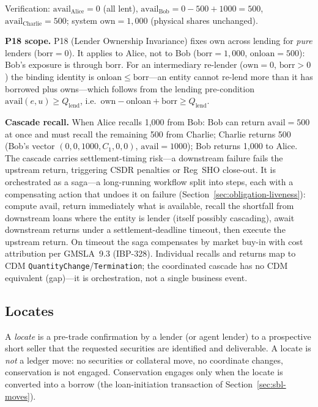 \documentclass[11pt,a4paper]{article}
\begin{document}
Verification: $\mathrm{avail}_{\text{Alice}} = 0$ (all lent), $\mathrm{avail}_{\text{Bob}} = 0-500+1000 = 500$, $\mathrm{avail}_{\text{Charlie}} = 500$; system $\mathrm{own} = 1{,}000$ (physical shares unchanged).

\noindent\textbf{P18 scope.} P18 (Lender Ownership Invariance) fixes $\mathrm{own}$ across lending for \emph{pure} lenders ($\mathrm{borr}=0$). It applies to Alice, not to Bob ($\mathrm{borr}=1{,}000$, $\mathrm{onloan}=500$): Bob's exposure is through $\mathrm{borr}$. For an intermediary re-lender ($\mathrm{own}=0$, $\mathrm{borr}>0$) the binding identity is $\mathrm{onloan}\leq\mathrm{borr}$---an entity cannot re-lend more than it has borrowed plus owns---which follows from the lending pre-condition $\mathrm{avail}(e,u)\geq Q_{\mathrm{lend}}$, i.e.\ $\mathrm{own}-\mathrm{onloan}+\mathrm{borr}\geq Q_{\mathrm{lend}}$.

\noindent\textbf{Cascade recall.} When Alice recalls 1{,}000 from Bob: Bob can return $\mathrm{avail}=500$ at once and must recall the remaining 500 from Charlie; Charlie returns 500 (Bob's vector $(0,0,1000,C_1,0,0)$, $\mathrm{avail}=1000$); Bob returns 1{,}000 to Alice. The cascade carries settlement-timing risk---a downstream failure fails the upstream return, triggering CSDR penalties or Reg~SHO close-out. It is orchestrated as a saga---a long-running workflow split into steps, each with a compensating action that undoes it on failure (Section~\ref{sec:obligation-liveness}): compute $\mathrm{avail}$, return immediately what is available, recall the shortfall from downstream loans where the entity is lender (itself possibly cascading), await downstream returns under a settlement-deadline timeout, then execute the upstream return. On timeout the saga compensates by market buy-in with cost attribution per GMSLA~9.3 (IBP-328). Individual recalls and returns map to CDM \texttt{QuantityChange}/\texttt{Termination}; the coordinated cascade has no CDM equivalent (gap)---it is orchestration, not a single business event.

\subsection{Locates}
\label{sec:sbl-locates}

A \emph{locate} is a pre-trade confirmation by a lender (or agent lender) to a prospective short seller that the requested securities are identified and deliverable. A locate is \emph{not} a ledger move: no securities or collateral move, no coordinate changes, conservation is not engaged. Conservation engages only when the locate is converted into a borrow (the loan-initiation transaction of Section~\ref{sec:sbl-moves}).
\end{document}
